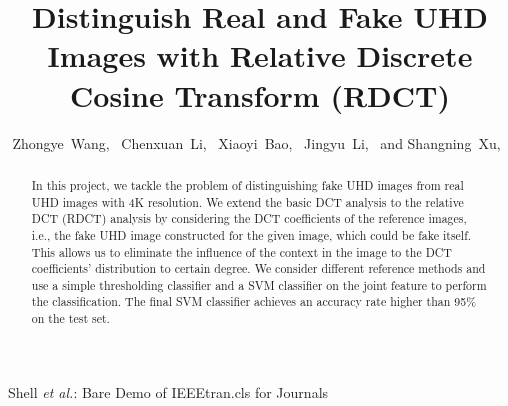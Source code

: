 \documentclass[journal,conference]{IEEEtran}
\begin{document}
%
\title{Distinguish Real and Fake UHD Images with Relative Discrete Cosine Transform (RDCT)}
%
%
%

\author{
	Zhongye~Wang,~
	Chenxuan~Li,~
	Xiaoyi~Bao,~
	Jingyu~Li,~
	and Shangning~Xu,~
}

%
{Shell \MakeLowercase{\textit{et al.}}: Bare Demo of IEEEtran.cls for Journals}
%


\maketitle

\begin{abstract}
In this project, we tackle the problem of distinguishing fake UHD images from real UHD images with 4K resolution.
We extend the basic DCT analysis to the relative DCT (RDCT) analysis by considering the DCT coefficients of the reference images, i.e., the fake UHD image constructed for the given image, which could be fake itself.
This allows us to eliminate the influence of the context in the image to the DCT coefficients' distribution to certain degree.
We consider different reference methods and use a simple thresholding classifier and a SVM classifier on the joint feature to perform the classification.
The final SVM classifier achieves an accuracy rate higher than 95\% on the test set.
\end{abstract}
\end{document}
